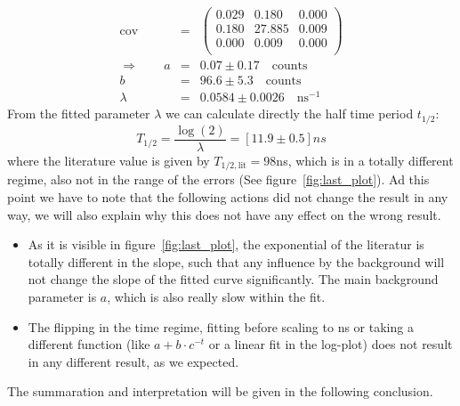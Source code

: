 \begin{align}
    \mathrm{cov}&=& 
    \begin{pmatrix}
        0.029 &0.180 &0.000 \\
        0.180 &27.885 &0.009 \\
        0.000 &0.009 &0.000 \\
    \end{pmatrix}
\\ \Rightarrow \qquad
    a &=& 0.07 \pm 0.17 \quad \mathrm{counts}\\
    b &=& 96.6 \pm 5.3 \quad \mathrm{counts}\\
    \lambda &=& 0.0584 \pm 0.0026 \quad \mathrm{ns}^{-1}
\end{align}
From the fitted parameter $\lambda$ we can calculate directly the half time period $t_{1/2}$:
\begin{equation}
T_{1/2} =\frac{\log(2)}{\lambda} =\left [11.9 \pm 0.5 \right ] ns 
\end{equation}
where the literature value is given by \cite{ver} $T_{1/2, \mathrm{lit}}=98$ns, which is 
in a totally different regime, also not in the range of the errors (See figure~\ref{fig:last_plot}).
Ad this point we have to note that the following actions did not change the result in any way, we will also
explain why this does not have any effect on the wrong result.
\begin{itemize}
\item As it is visible in figure~\ref{fig:last_plot}, the exponential of the literatur is totally different
in the slope, such that any influence by the background will not change the slope of the fitted curve 
significantly. The main background parameter is $a$, which is also really slow within the fit. 
\item The flipping in the time regime, fitting before scaling to ns or taking a different function (like
$a+b\cdot c^{-t}$ or a linear fit in the log-plot) does not result in any different result, as we expected.
\end{itemize}
The summaration and interpretation will be given in the following conclusion.

